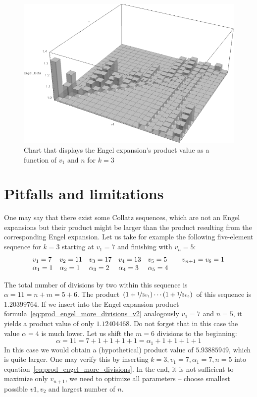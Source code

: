 \documentclass[12pt]{amsart}
\theoremstyle{definition}
\begin{document}
\begin{figure}
	\begin{center}
		\includegraphics[width=1.0\textwidth]{plot.png}
		\caption{Chart that displays the Engel expansion's product value as a function of $v_1$ and $n$ for $k=3$}
		\label{fig:1}
	\end{center}
\end{figure}

\section{Pitfalls and limitations}
One may say that there exist some Collatz sequences, which are not an Engel expansions but their product might be larger than the product resulting from the corresponding Engel expansion. Let us take for example the following five-element sequence for $k=3$ starting at $v_1=7$ and finishing with $v_{n}=5$:
\[
\begin{array}{l@{\hspace{1em}}l@{\hspace{1em}}l@{\hspace{1em}}l@{\hspace{1em}}l@{\hspace{2em}}l}
v_1=7&v_2=11&v_3=17&v_4=13&v_5=5&v_{n+1}=v_6=1\\
\alpha_1=1&\alpha_2=1&\alpha_3=2&\alpha_4=3&\alpha_5=4&
\end{array}
\]

The total number of divisions by two within this sequence is $\alpha=11=n+m=5+6$. The product $(1+\nicefrac{1}{3v_1})\cdots(1+\nicefrac{1}{3v_5})$ of this sequence is $1.20399764$. If we insert into the Engel expansion product formula~\ref{eq:prod_engel_more_divisions_v2} analogously $v_1=7$ and $n=5$, it yields a product value of only $1.12404468$. Do not forget that in this case the value $\alpha=4$ is much lower. Let us shift the $m=6$ divisions to the beginning:
\[
\alpha=11=7+1+1+1+1=\alpha_1+1+1+1+1
\]
In this case we would obtain a (hypothetical) product value of $5.93885949$, which is quite larger. One may verify this by inserting $k=3,v_1=7,\alpha_1=7,n=5$ into equation~\ref{eq:prod_engel_more_divisions}. In the end, it is not sufficient to maximize only $v_{n+1}$, we need to optimize all parameters -- choose smallest possible $v1,v_2$ and largest number of $n$.
\end{document}
